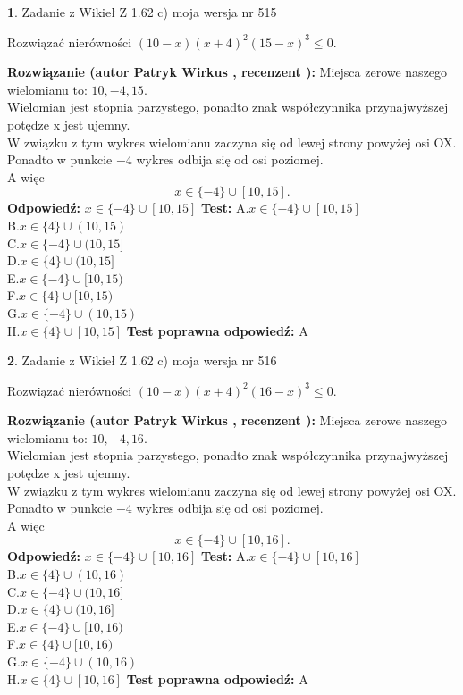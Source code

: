\documentclass[12pt, a4paper]{article}
\theoremstyle{definition} %
\newtheorem{zad}{}
\newcommand{\zadStart}[1]{\begin{zad}#1\newline}
\newcommand{\zadStop}{\end{zad}}
\newcommand{\rozwStart}[2]{\noindent \textbf{Rozwiązanie (autor #1 , recenzent #2): }\newline}
\newcommand{\rozwStop}{\newline}
\newcommand{\odpStart}{\noindent \textbf{Odpowiedź:}\newline}
\newcommand{\odpStop}{\newline}
\newcommand{\testStart}{\noindent \textbf{Test:}\newline}
\newcommand{\testStop}{\newline}
\newcommand{\kluczStart}{\noindent \textbf{Test poprawna odpowiedź:}\newline}
\newcommand{\kluczStop}{\newline}
\begin{document}
\zadStart{Zadanie z Wikieł Z 1.62 c) moja wersja nr 515}

Rozwiązać nierówności $(10-x)(x+4)^{2}(15-x)^{3}\le0$.
\zadStop
\rozwStart{Patryk Wirkus}{}
Miejsca zerowe naszego wielomianu to: $10, -4, 15$.\\
Wielomian jest stopnia parzystego, ponadto znak współczynnika przy\linebreak najwyższej potędze x jest ujemny.\\ W związku z tym wykres wielomianu zaczyna się od lewej strony powyżej osi OX.\\
Ponadto w punkcie $-4$ wykres odbija się od osi poziomej.\\
A więc $$x \in \{-4\} \cup [10,15].$$
\rozwStop
\odpStart
$x \in \{-4\} \cup [10,15]$
\odpStop
\testStart
A.$x \in \{-4\} \cup [10,15]$\\
B.$x \in \{4\} \cup (10,15)$\\
C.$x \in \{-4\} \cup (10,15]$\\
D.$x \in \{4\} \cup (10,15]$\\
E.$x \in \{-4\} \cup [10,15)$\\
F.$x \in \{4\} \cup [10,15)$\\
G.$x \in \{-4\} \cup (10,15)$\\
H.$x \in \{4\} \cup [10,15]$
\testStop
\kluczStart
A
\kluczStop



\zadStart{Zadanie z Wikieł Z 1.62 c) moja wersja nr 516}

Rozwiązać nierówności $(10-x)(x+4)^{2}(16-x)^{3}\le0$.
\zadStop
\rozwStart{Patryk Wirkus}{}
Miejsca zerowe naszego wielomianu to: $10, -4, 16$.\\
Wielomian jest stopnia parzystego, ponadto znak współczynnika przy\linebreak najwyższej potędze x jest ujemny.\\ W związku z tym wykres wielomianu zaczyna się od lewej strony powyżej osi OX.\\
Ponadto w punkcie $-4$ wykres odbija się od osi poziomej.\\
A więc $$x \in \{-4\} \cup [10,16].$$
\rozwStop
\odpStart
$x \in \{-4\} \cup [10,16]$
\odpStop
\testStart
A.$x \in \{-4\} \cup [10,16]$\\
B.$x \in \{4\} \cup (10,16)$\\
C.$x \in \{-4\} \cup (10,16]$\\
D.$x \in \{4\} \cup (10,16]$\\
E.$x \in \{-4\} \cup [10,16)$\\
F.$x \in \{4\} \cup [10,16)$\\
G.$x \in \{-4\} \cup (10,16)$\\
H.$x \in \{4\} \cup [10,16]$
\testStop
\kluczStart
A
\kluczStop
\end{document}
